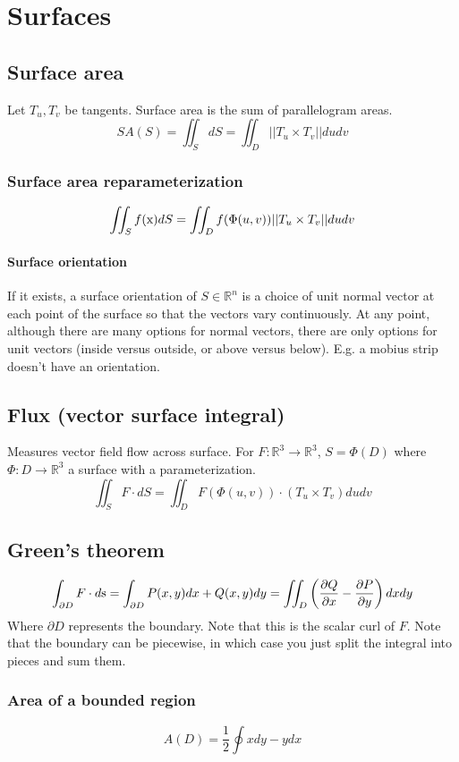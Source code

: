 
\chapter*{Surfaces}
\section*{Surface area}
Let $T_u, T_v$ be tangents. Surface area is the sum of parallelogram areas.
$$SA(S) = \iint_SdS = \iint_{D}||T_u\times T_v||dudv$$
\subsection*{Surface area reparameterization}
$$\iint_S f(\textrm{x})dS = \iint_D f(\Phi(u,v))||T_u\times T_v|| du dv$$
\subsubsection{Surface orientation}
If it exists, a surface orientation of $S\in \mathbb{R}^n$ is a choice of unit normal vector at each point of the surface so that the vectors vary continuously. At any point, although there are many options for normal vectors, there are only options for unit vectors (inside versus outside, or above versus below). E.g. a mobius strip doesn't have an orientation.

\section*{Flux (vector surface integral)}
Measures vector field flow across surface.
For $F:\mathbb{R}^3\to\mathbb{R}^3$, $S=\Phi(D)$ where $\Phi:D\to\mathbb{R}^3$ a surface with a parameterization.
$$\iint_{S}F\cdot dS=\iint_{D}F(\Phi(u,v))\cdot (T_u\times T_v)dudv$$

\section*{Green's theorem}
$$\int_{\partial D}F\cdot d\textrm{s} = \int_{\partial D}P(x,y)dx + Q(x,y)dy = \iint_{D}\left(\frac{\partial Q}{\partial x} - \frac{\partial P}{\partial y}\right)dx dy$$
Where $\partial D$ represents the boundary. Note that this is the scalar curl of $F$. Note that the boundary can be piecewise, in which case you just split the integral into pieces and sum them.
\subsection*{Area of a bounded region}
$$A(D) = \frac{1}{2}\oint xdy - ydx$$
